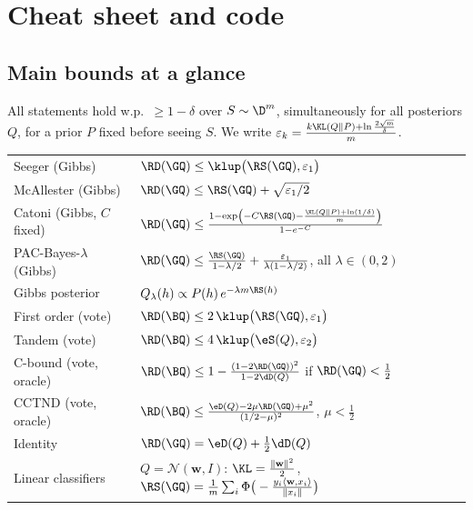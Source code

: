 \section{Cheat sheet and code}
\label{app:cheat}

\subsection{Main bounds at a glance}

All statements hold w.p.\ $\geq1-\delta$ over $S\sim\D^m$, simultaneously for all
posteriors $Q$, for a prior $P$ fixed before seeing $S$. We write
$\varepsilon_k=\frac{k\KL(Q\|P)+\ln\frac{2\sqrt m}{\delta}}{m}$.

\begin{center}
\renewcommand{\arraystretch}{1.6}
\begin{tabular}{p{3.9cm}p{9.6cm}}
\toprule
Seeger (Gibbs) & $\RD(\GQ)\leq\klup\big(\RS(\GQ),\varepsilon_1\big)$ \\
McAllester (Gibbs) & $\RD(\GQ)\leq\RS(\GQ)+\sqrt{\varepsilon_1/2}$ \\
Catoni (Gibbs, $C$ fixed) & $\RD(\GQ)\leq\frac{1-\exp\left(-C\RS(\GQ)-\frac{\KL(Q\|P)+\ln(1/\delta)}{m}\right)}{1-e^{-C}}$ \\
PAC-Bayes-$\lambda$ (Gibbs) & $\RD(\GQ)\leq\frac{\RS(\GQ)}{1-\lambda/2}+\frac{\varepsilon_1}{\lambda(1-\lambda/2)}$, all $\lambda\in(0,2)$ \\
Gibbs posterior & $Q_\lambda(h)\propto P(h)\,e^{-\lambda m\RS(h)}$ \\
First order (vote) & $\RD(\BQ)\leq2\,\klup\big(\RS(\GQ),\varepsilon_1\big)$ \\
Tandem (vote) & $\RD(\BQ)\leq4\,\klup\big(\eS(Q),\varepsilon_2\big)$ \\
C-bound (vote, oracle) & $\RD(\BQ)\leq1-\frac{(1-2\RD(\GQ))^2}{1-2\dD(Q)}$ if $\RD(\GQ)<\frac12$ \\
CCTND (vote, oracle) & $\RD(\BQ)\leq\frac{\eD(Q)-2\mu\RD(\GQ)+\mu^2}{(1/2-\mu)^2}$, $\mu<\frac12$ \\
Identity & $\RD(\GQ)=\eD(Q)+\frac12\dD(Q)$ \\
Linear classifiers & $Q=\mathcal N(\mathbf w,I)$: $\KL=\frac{\|\mathbf w\|^2}{2}$, $\RS(\GQ)=\frac1m\sum_i\Phi\big(-\frac{y_i\langle\mathbf w,x_i\rangle}{\|x_i\|}\big)$ \\
\bottomrule
\end{tabular}
\end{center}

